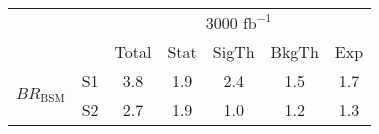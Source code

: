 \begin{tabular}{@{} l c c@{\hskip 0.15in} c c c c @{}}
 \hline
  &  & \multicolumn{5}{c}{3000 $\text{fb}^{-1}$} \\
  &  & Total & Stat & SigTh & BkgTh & Exp \\
 \hline
\multirow{2}{*}{$BR_{\mathrm{BSM}}$} & S1  & 3.8& 1.9 & 2.4 & 1.5 & 1.7  \\[1pt]
                        & S2  & 2.7& 1.9 & 1.0 & 1.2 & 1.3  \\[4pt]
\hline
\end{tabular}